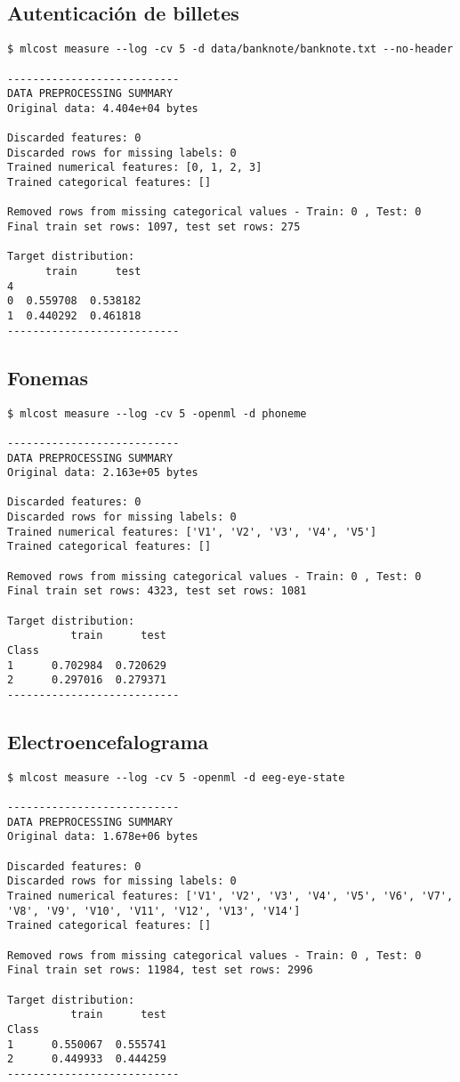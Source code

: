 \subsection{Autenticación de billetes}
\begin{verbatim}
$ mlcost measure --log -cv 5 -d data/banknote/banknote.txt --no-header

---------------------------
DATA PREPROCESSING SUMMARY
Original data: 4.404e+04 bytes

Discarded features: 0
Discarded rows for missing labels: 0
Trained numerical features: [0, 1, 2, 3]
Trained categorical features: []

Removed rows from missing categorical values - Train: 0 , Test: 0
Final train set rows: 1097, test set rows: 275

Target distribution:
      train      test
4                    
0  0.559708  0.538182
1  0.440292  0.461818
---------------------------
\end{verbatim}

\subsection{Fonemas}
\begin{verbatim}
$ mlcost measure --log -cv 5 -openml -d phoneme

---------------------------
DATA PREPROCESSING SUMMARY
Original data: 2.163e+05 bytes

Discarded features: 0
Discarded rows for missing labels: 0
Trained numerical features: ['V1', 'V2', 'V3', 'V4', 'V5']
Trained categorical features: []

Removed rows from missing categorical values - Train: 0 , Test: 0
Final train set rows: 4323, test set rows: 1081

Target distribution:
          train      test
Class                    
1      0.702984  0.720629
2      0.297016  0.279371
---------------------------
\end{verbatim}

\subsection{Electroencefalograma}
\begin{verbatim}
$ mlcost measure --log -cv 5 -openml -d eeg-eye-state

---------------------------
DATA PREPROCESSING SUMMARY
Original data: 1.678e+06 bytes

Discarded features: 0
Discarded rows for missing labels: 0
Trained numerical features: ['V1', 'V2', 'V3', 'V4', 'V5', 'V6', 'V7', 'V8', 'V9', 'V10', 'V11', 'V12', 'V13', 'V14']
Trained categorical features: []

Removed rows from missing categorical values - Train: 0 , Test: 0
Final train set rows: 11984, test set rows: 2996

Target distribution:
          train      test
Class                    
1      0.550067  0.555741
2      0.449933  0.444259
---------------------------
\end{verbatim}

